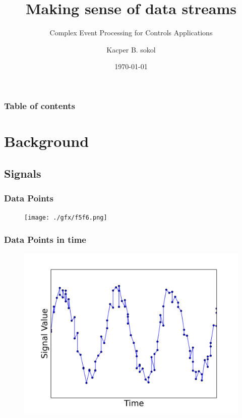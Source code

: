 \documentclass{beamer}
\begin{document}
\title{Making sense of data streams}
\subtitle{Complex Event Processing for Controls Applications}
\author{Kacper B. sokol}
\date{\today}

\begin{frame}[plain]
	\titlepage
\end{frame}

\begin{frame}[plain]
  \frametitle{Table of contents}
  \tableofcontents
\end{frame}


\section{Background} 
  \subsection{Signals}
  \begin{frame}[plain]
    \frametitle{Data Points}
    \begin{figure}
      \texttt{[image: ./gfx/f5f6.png]}
    \end{figure}
  \end{frame}

  \begin{frame}[plain]
    \frametitle{Data Points in time}
    \begin{figure}
      \includegraphics[scale=.5]{./gfx/feature5.png}
    \end{figure}
  \end{frame}
\end{document}
